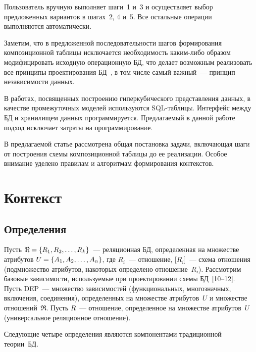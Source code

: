 \begin{multicols}{2}
  Пользователь вручную выполняет шаги~1 и~3 и осуществляет выбор 
предложенных вариантов в шагах~2, 4 и~5. Все остальные операции 
выполняются автоматически.
  
  Заметим, что в предложенной последо\-ва\-тель\-ности шагов формирования 
композиционной таб\-ли\-цы исключается необходимость ка\-ким-ли\-бо образом 
модифицировать исходную операционную БД, что делает возможным 
реализовать все принципы проектирования БД~\cite{10-z, 11-z}, в том числе 
самый важный~--- принцип независимости данных.
  
  В работах, посвященных построению гиперкубического представления 
данных, в качестве промежуточных моделей используются SQL-таб\-ли\-цы. 
Интерфейс между БД и хранилищем данных программируется. Предлагаемый в 
данной работе подход исключает затраты на программирование.
  
  В предлагаемой статье рассмотрена общая постановка задачи, включающая 
шаги от построения схемы композиционной таблицы до ее реализации. Особое 
внимание уделено правилам и алгоритмам формирования контекстов.

\vspace*{-6pt}
  
\section{Контекст}

\vspace*{-2pt}

\subsection{Определения} %

\vspace*{-1pt}
  
  Пусть $\Re\hm= \{R_1, R_2, \ldots , R_k\}$~--- реляционная БД, определенная 
на множестве атрибутов $U\hm= \{A_1, A_2, \ldots , A_n\}$, где $R_i$~--- 
отношение, [$R_i$]~--- схема отношения (подмножество атрибутов, на\linebreak которых 
определено отношение~$R_i$). Рассмотрим базовые зависимости, используемые 
при проектировании схемы БД~[10--12]. Пусть DEP~--- 
мно\-жество зависимостей (функциональных, многозначных, включения, 
соединения), определенных на множестве атрибутов~$U$ и множестве 
отношений~$\Re$. Пусть $R$~--- отношение, определенное на множестве 
атрибутов~$U$ (универсальное реляционное отношение). 

Следующие четыре 
определения являются компонентами традиционной теории~БД.
{ %

}
\end{multicols}

